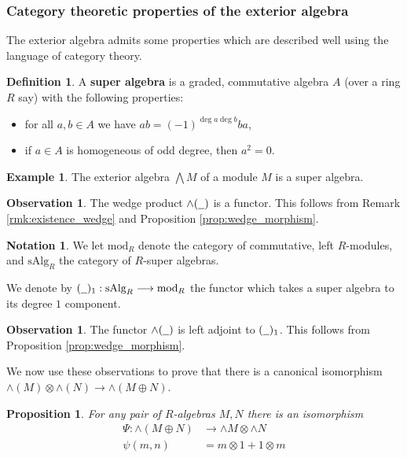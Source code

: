 \documentclass[12pt]{article}
\theoremstyle{plain}
\newtheorem{proposition}[thm]{Proposition}
\theoremstyle{definition}
\newtheorem{defn}[thm]{Definition} %
\newtheorem{notation}[thm]{Notation}
\newtheorem{example}[thm]{Example}
\newtheorem{observation}[thm]{Observation}
\newcommand{\und}[1]{\underline{\hspace{#1 cm}}}
\newcommand{\lto}{\longrightarrow}
\begin{document}
\subsubsection{Category theoretic properties of the exterior algebra}
The exterior algebra admits some properties which are described well using the language of category theory.
\begin{defn}
A \textbf{super algebra} is a graded, commutative algebra $A$ (over a ring $R$ say) with the following properties:
\begin{itemize}
\item for all $a,b \in A$ we have $ab = (-1)^{\operatorname{deg}a\operatorname{deg}b}ba$,
\item if $a \in A$ is homogeneous of odd degree, then $a^2 = 0$.
\end{itemize}
\end{defn}
\begin{example}
The exterior algebra $\bigwedge M$ of a module $M$ is a super algebra.
\end{example}
\begin{observation}
The wedge product $\wedge(\und{0.2})$ is a functor. This follows from Remark \ref{rmk:existence_wedge} and Proposition \ref{prop:wedge_morphism}.
\end{observation}
\begin{notation}
We let $\text{mod}_R$ denote the category of commutative, left $R$-modules, and $\text{sAlg}_R$ the category of $R$-super algebras.

We denote by $(\und{0.2})_1: \text{sAlg}_R \lto \text{mod}_R$ the functor which takes a super algebra to its degree $1$ component.
\end{notation}
\begin{observation}\label{obs:wedge_adjunction}
The functor $\wedge(\und{0.2})$ is left adjoint to $(\und{0.2})_1$. This follows from Proposition \ref{prop:wedge_morphism}.
\end{observation}
We now use these observations to prove that there is a canonical isomorphism $\wedge(M) \otimes \wedge(N) \lto \wedge(M \oplus N)$.
\begin{proposition}\label{prop:sum_tensor_wedge}
For any pair of $R$-algebras $M,N$ there is an isomorphism
\begin{align*}
    \Psi: \wedge ( M \oplus N ) &\lto \wedge M \otimes \wedge N\\
    \psi(m, n) &= m \otimes 1 + 1 \otimes m
\end{align*}
\end{proposition}
\end{document}
